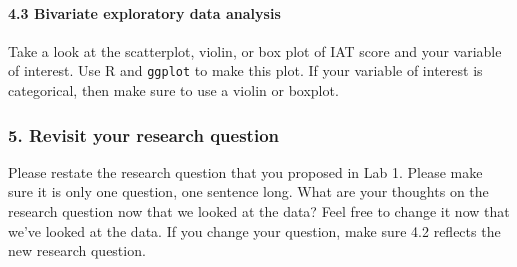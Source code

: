 \documentclass[
  letterpaper,
  DIV=11,
  numbers=noendperiod]{scrartcl}
\let\oldparagraph\paragraph
\renewcommand{\paragraph}[1]{\oldparagraph{#1}\mbox{}}
\begin{document}
\hypertarget{bivariate-exploratory-data-analysis}{%
\paragraph{4.3 Bivariate exploratory data
analysis}\label{bivariate-exploratory-data-analysis}}

\begin{tcolorbox}[enhanced jigsaw, coltitle=black, bottomrule=.15mm, opacityback=0, arc=.35mm, toprule=.15mm, colbacktitle=quarto-callout-important-color!10!white, left=2mm, colback=white, opacitybacktitle=0.6, colframe=quarto-callout-important-color-frame, rightrule=.15mm, leftrule=.75mm, breakable, bottomtitle=1mm, titlerule=0mm, toptitle=1mm, title=\textcolor{quarto-callout-important-color}{\faExclamation}\hspace{0.5em}{Task}]

Take a look at the scatterplot, violin, or box plot of IAT score and
your variable of interest. Use R and \texttt{ggplot} to make this plot.
If your variable of interest is categorical, then make sure to use a
violin or boxplot.

\end{tcolorbox}

\hypertarget{revisit-your-research-question}{%
\subsubsection{5. Revisit your research
question}\label{revisit-your-research-question}}

\begin{tcolorbox}[enhanced jigsaw, coltitle=black, bottomrule=.15mm, opacityback=0, arc=.35mm, toprule=.15mm, colbacktitle=quarto-callout-important-color!10!white, left=2mm, colback=white, opacitybacktitle=0.6, colframe=quarto-callout-important-color-frame, rightrule=.15mm, leftrule=.75mm, breakable, bottomtitle=1mm, titlerule=0mm, toptitle=1mm, title=\textcolor{quarto-callout-important-color}{\faExclamation}\hspace{0.5em}{Task}]

Please restate the research question that you proposed in Lab 1. Please
make sure it is only one question, one sentence long. What are your
thoughts on the research question now that we looked at the data? Feel
free to change it now that we've looked at the data. If you change your
question, make sure 4.2 reflects the new research question.

\end{tcolorbox}
\end{document}
